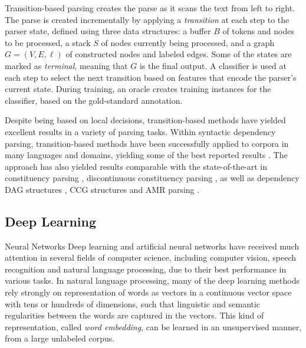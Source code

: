 \documentclass[11pt]{article}
\makeatletter
\renewcommand{\paragraph}{
  \@startsection{paragraph}{4}
  {\z@}{.3ex \@plus .3ex \@minus .2ex}{-1em}
  {\normalfont\normalsize\bfseries}
}
\makeatother
\begin{document}
Transition-based parsing \cite{Nivre03anefficient} creates the parse
as it scans the text from left to right.
The parse is created incrementally by applying a \textit{transition} at each step to the parser state,
defined using three data structures: a buffer $B$ of tokens and nodes to be processed,
a stack $S$ of nodes currently being processed,
and a graph $G=(V,E,\ell)$ of constructed nodes and labeled edges.
Some of the states are marked as \textit{terminal}, meaning that $G$ is the final output.
A classifier is used at each step to select the next transition based on features
that encode the parser's current state.
During training, an oracle creates training instances for the classifier,
based on the gold-standard annotation.

Despite being based on local decisions, transition-based methods have yielded excellent
results in a variety of parsing tasks.
Within syntactic dependency parsing, transition-based methods
have been successfully applied to corpora in many languages and domains, yielding some
of the best reported results \cite{dyer2015transition,ballesteros2015improved}. 
The approach has also yielded results comparable with the state-of-the-art in
constituency parsing \cite{sagae2005classifier,zhang2009transition,zhu2013fast},
discontinuous constituency parsing \cite{maier2015discontinuous},
as well as dependency DAG structures
\cite{sagae2008shift,tokgoz2015transition}, CCG structures \cite{ambati2015incremental}
and AMR parsing \cite{wang2015transition}.


\subsection{Deep Learning}

\paragraph{Neural Networks}
Deep learning and artificial neural networks have received much attention in
several fields of computer science, including computer vision, speech
recognition and natural language processing, due to their best performance in
various tasks\cite{collobert2011nlp}.
In natural language processing, many of the deep learning methods rely strongly
on representation of words as vectors in a continuous vector space with tens or
hundreds of dimensions\cite{turian2010word}, such that linguistic and semantic
regularities between the words are captured in the
vectors\cite{mikolov2013linguistic}. This kind of representation, called
\textit{word embedding}, can be learned in an unsupervised manner, from a large
unlabeled corpus.
\end{document}
